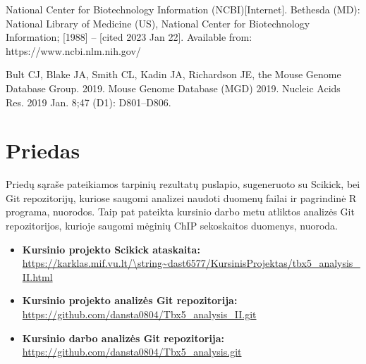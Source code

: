 \documentclass[12pt]{article}
\begin{document}
\begin{thebibliography}{99}
 National Center for Biotechnology Information (NCBI)[Internet].
Bethesda (MD): National Library of Medicine (US), National Center for
Biotechnology Information; [1988] – [cited 2023 Jan 22]. Available from:
https://www.ncbi.nlm.nih.gov/

 Bult CJ, Blake JA, Smith CL, Kadin JA, Richardson JE, the
Mouse Genome Database Group. 2019. Mouse Genome Database (MGD) 2019.
Nucleic Acids Res. 2019 Jan. 8;47 (D1): D801–D806.
\end{thebibliography}

\newpage


\section{Priedas} \label{Priedas}
Priedų sąraše pateikiamos tarpinių rezultatų puslapio, sugeneruoto su Scikick,
bei Git re\-po\-zi\-to\-ri\-jų, kuriose saugomi analizei naudoti duomenų
failai ir pagrindinė R programa, nuorodos. Taip pat pateikta kursinio darbo metu
atliktos analizės Git repozitorijos, kurioje saugomi mėginių ChIP sekoskaitos
duomenys, nuoroda.

\begin{itemize}
    \item \textbf{Kursinio projekto Scikick ataskaita:}\\
        \url{https://karklas.mif.vu.lt/\string~dast6577/KursinisProjektas/tbx5\_analysis\_II.html}
    \item \textbf{Kursinio projekto analizės Git repozitorija:}\\
        \url{https://github.com/dansta0804/Tbx5\_analysis\_II.git}
    \item \textbf{Kursinio darbo analizės Git repozitorija:}\\
        \url{https://github.com/dansta0804/Tbx5\_analysis.git}
  \end{itemize}
\end{document}
